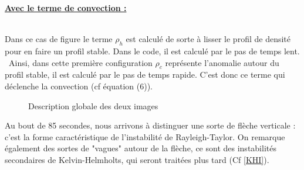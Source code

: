 \documentclass{rapportECC}
\begin{document}
\vspace{1 cm}
\underline{\textbf{Avec le terme de convection :}}
\vspace{0.5 cm}

\\
Dans ce cas de figure le terme $\rho_h$ est calculé de sorte à  lisser le profil de densité pour en faire un profil stable. Dans le code, il est calculé par le pas de temps lent. \
Ainsi, dans cette première configuration $\rho_c$ représente l'anomalie autour du profil stable, il est calculé par le pas de temps rapide. C'est donc ce terme qui déclenche la convection (cf équation (6)). \\

\begin{figure}[htb]
    \centering
    \hfill
    \caption{Description globale des deux images}
    \label{fig:images_cote_a_cote}
\end{figure}

Au bout de 85 secondes, nous arrivons à distinguer une sorte de flèche verticale : c'est la forme caractéristique de l'instabilité de Rayleigh-Taylor. On remarque également des sortes de "vagues" autour de la flèche, ce sont des instabilités secondaires de Kelvin-Helmholts, qui seront traitées plus tard (Cf \ref{KHI}).


\vspace{1 cm}
\end{document}
